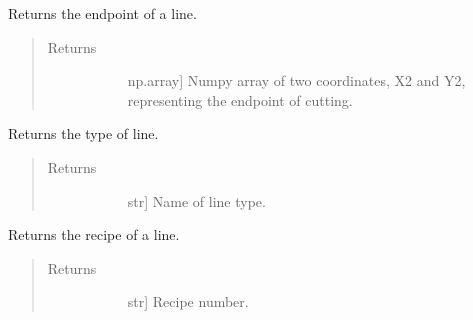\documentclass[letterpaper,10pt,english,openany,oneside]{sphinxmanual}
\begin{document}
\begin{fulllineitems}
\begin{fulllineitems}
\label{\detokenize{reference:cnc.optimization.Line.get_endpoint}}
Returns the endpoint of a line.
\begin{quote}\begin{description}
\item[{Returns}] \leavevmode\begin{description}
\item[{}] \leavevmode{[}np.array{]}
Numpy array of two coordinates, X2 and Y2, representing the
endpoint of cutting.

\end{description}

\end{description}\end{quote}

\end{fulllineitems}


\begin{fulllineitems}
\label{\detokenize{reference:cnc.optimization.Line.get_line_type}}
Returns the type of line.
\begin{quote}\begin{description}
\item[{Returns}] \leavevmode\begin{description}
\item[{}] \leavevmode{[}str{]}
Name of line type.

\end{description}

\end{description}\end{quote}

\end{fulllineitems}


\begin{fulllineitems}
\label{\detokenize{reference:cnc.optimization.Line.get_recipe}}
Returns the recipe of a line.
\begin{quote}\begin{description}
\item[{Returns}] \leavevmode\begin{description}
\item[{}] \leavevmode{[}str{]}
Recipe number.


\end{description}
\end{description}
\end{quote}
\end{fulllineitems}
\end{fulllineitems}
\end{document}
